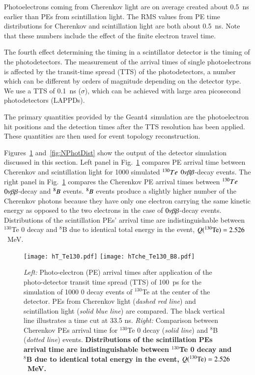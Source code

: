 Photoelectrons coming from Cherenkov light are on average
created about 0.5~ns earlier than PEs from scintillation light. The
RMS values from PE time distributions for Cherenkov and scintillation
light are both about 0.5~ns. Note that these numbers include the
effect of the finite electron travel time.

The fourth effect determining the timing in a scintillator detector is the timing of the photodetectors. The measurement of the arrival times of single photoelectrons is
affected by the transit-time spread (TTS) of the photodetectors, a
number which can be different by orders of magnitude depending on the
detector type. We use a TTS of 0.1~ns ($\sigma$), which can be achieved with large area picosecond photodetectors
(LAPPDs)\cite{anode_paper,PSEC4_paper,RSI_paper,Vienna2013,Ceramic_paper1,HV_paper,Timing_paper,Incom_paper}.

The primary quantities provided by the Geant4~simulation are the photoelectron hit
positions and the detection times after the TTS resolution has been
applied. These quantities are then used for event topology reconstruction.

Figures~\ref{fig:ArrivalTimeDist} and~\ref{fig:NPhotDist} show the output of the detector simulation discussed in this section. Left panel in Fig.~\ref{fig:ArrivalTimeDist} compares PE arrival time between Cherenkov and scintillation light for 1000 simulated $^{130}Te$ $0\nu\beta\beta$-decay events. The right panel in Fig.~\ref{fig:ArrivalTimeDist} compares the Cherenkov PE arrival times between $^{130}Te$ $0\nu\beta\beta$-decay and $^{8}B$ events. $^{8}B$ events produce a slightly higher number of the Cherenkov photons because they have only one electron carrying the same kinetic energy as opposed to the two electrons in the case of $0\nu\beta\beta$-decay events. Distributions of the scintillation PEs' arrival time are indistinguishable between $^{130}$Te 0{\nbb} decay and $^8$B due to identical total energy in the event, $Q(^{130}{\rm Te})=2.526$~MeV.

\begin{figure*}[ht]
  \centering
  \texttt{[image: hT\_Te130.pdf]}
  \texttt{[image: hTche\_Te130\_B8.pdf]}
  \caption{\emph{Left:} Photo-electron (PE) arrival times after
    application of the photo-detector transit time spread (TTS) of
    100~ps for the simulation of 1000 0{\nbb} decay events of
    $^{130}$Te at the center of the detector. PEs from Cherenkov light
    (\emph{dashed red line}) and scintillation light (\emph{solid blue
      line}) are compared. The black vertical line illustrates a time
    cut at 33.5 ns. \emph{Right:} Comparison between Cherenkov PEs
    arrival time for $^{130}$Te {0\nbb} decay (\emph{solid line}) and
    $^{8}$B (\emph{dotted line}) events. {\bf Distributions of the
      scintillation PEs arrival time are indistinguishable between
      $^{130}$Te 0{\nbb} decay and $^8$B due to identical total energy
      in the event, $Q(^{130}{\rm Te})=2.526$~MeV.} }
\label{fig:ArrivalTimeDist}
\end{figure*}

